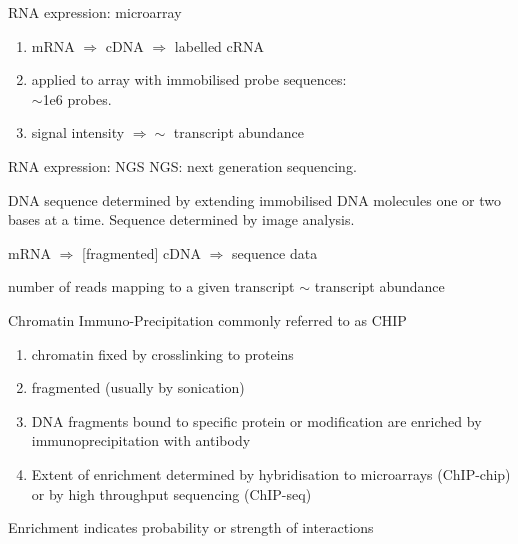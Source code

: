 \documentclass[pdf]{beamer}
\begin{document}
\begin{frame}{RNA expression: microarray}
  \begin{enumerate}
  \item mRNA $\Rightarrow$ cDNA $\Rightarrow$ labelled cRNA
  \item applied to array with immobilised probe sequences:\\
    $\sim$1e6 probes.
  \item signal intensity $\Rightarrow \sim$ transcript abundance
  \end{enumerate}
\end{frame}

\begin{frame}{RNA expression: NGS}
NGS: next generation sequencing.

DNA sequence determined by extending immobilised DNA molecules one
or two bases at a time. Sequence determined by image analysis.

mRNA $\Rightarrow$ [fragmented] cDNA $\Rightarrow$ sequence data

number of reads mapping to a given transcript $\sim$ transcript abundance
\end{frame} 

\begin{frame}{Chromatin Immuno-Precipitation}
  commonly referred to as CHIP

  \begin{enumerate}
  \item chromatin fixed by crosslinking to proteins
  \item  fragmented (usually by sonication)
  \item  DNA fragments bound to specific protein or modification
    are enriched by immunoprecipitation with antibody
  \item Extent of enrichment determined by hybridisation to microarrays
    (ChIP-chip) or by high throughput sequencing (ChIP-seq)
  \end{enumerate}

  Enrichment indicates probability or strength of interactions
\end{frame}
\end{document}
